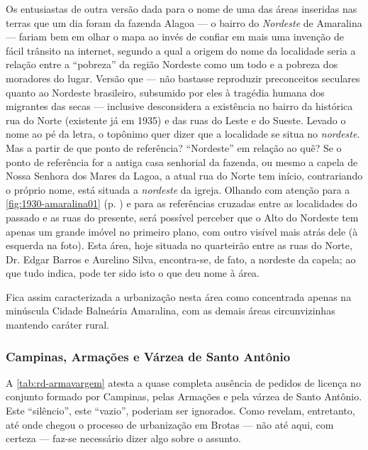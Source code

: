 Os entusiastas de outra versão dada para o nome de uma das áreas inseridas nas terras que um dia foram da fazenda Alagoa --- o bairro do \textit{Nordeste} de Amaralina --- fariam bem em olhar o mapa ao invés de confiar em mais uma invenção de fácil trânsito na internet, segundo a qual a origem do nome da localidade seria a relação entre a ``pobreza'' da região Nordeste como um todo e a pobreza dos moradores do lugar. Versão que --- não bastasse reproduzir preconceitos seculares quanto ao Nordeste brasileiro, subsumido por eles à tragédia humana dos migrantes das secas --- inclusive desconsidera a existência no bairro da histórica rua do Norte (existente já em 1935) e das ruas do Leste e do Sueste. Levado o nome ao pé da letra, o topônimo quer dizer que a localidade se situa no \textit{nordeste}. Mas a partir de que ponto de referência? ``Nordeste'' em relação ao quê? Se o ponto de referência for a antiga casa senhorial da fazenda, ou mesmo a capela de Nossa Senhora dos Mares da Lagoa, a atual rua do Norte tem início, contrariando o próprio nome, está situada a \textit{nordeste} da igreja. Olhando com atenção para a \autoref{fig:1930-amaralina01} (p. \pageref{fig:1930-amaralina01}) e para as referências cruzadas entre as localidades do passado e as ruas do presente, será possível perceber que o Alto do Nordeste tem apenas um grande imóvel no primeiro plano, com outro visível mais atrás dele (à esquerda na foto). Esta área, hoje situada no quarteirão entre as ruas do Norte, Dr. Edgar Barros e Aurelino Silva, encontra-se, de fato, a nordeste da capela; ao que tudo indica, pode ter sido isto o que deu nome à área.


Fica assim caracterizada a urbanização nesta área como concentrada apenas na minúscula Cidade Balneária Amaralina, com as demais áreas circunvizinhas mantendo caráter rural. 

\subsubsection{Campinas, Armações e Várzea de Santo Antônio}\label{subsubsec:campinas}


A \autoref{tab:rd-armavargem} atesta a quase completa ausência de pedidos de licença no conjunto formado por Campinas, pelas Armações e pela várzea de Santo Antônio. Este ``silêncio'', este ``vazio'', poderiam ser ignorados. Como revelam, entretanto, até onde chegou o processo de urbanização em Brotas --- não até aqui, com certeza --- faz-se necessário dizer algo sobre o assunto. 

